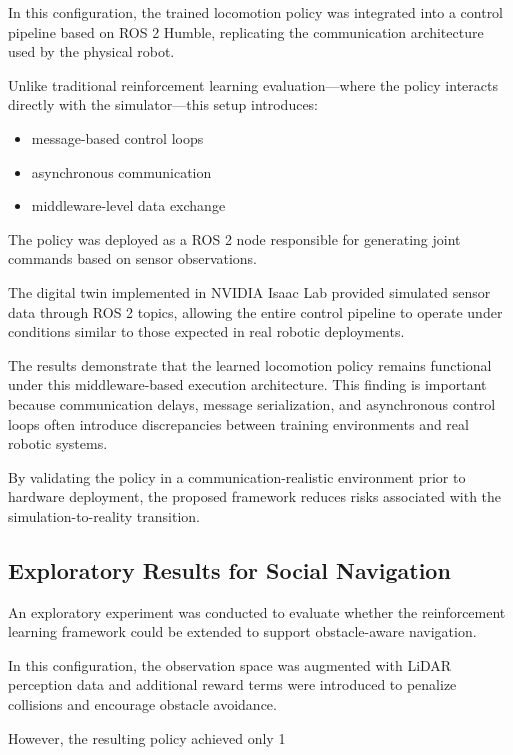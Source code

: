 \documentclass[pdflatex,sn-mathphys-num]{sn-jnl}%
\theoremstyle{thmstyleone}%
\theoremstyle{thmstyletwo}%
\theoremstyle{thmstylethree}%
\begin{document}
In this configuration, the trained locomotion policy was integrated into a control pipeline based on ROS 2 Humble, replicating the communication architecture used by the physical robot.

Unlike traditional reinforcement learning evaluation—where the policy interacts directly with the simulator—this setup introduces:
\begin{itemize}
    \item message-based control loops
    \item asynchronous communication
    \item middleware-level data exchange
\end{itemize} 

The policy was deployed as a ROS 2 node responsible for generating joint commands based on sensor observations.

The digital twin implemented in NVIDIA Isaac Lab provided simulated sensor data through ROS 2 topics, allowing the entire control pipeline to operate under conditions similar to those expected in real robotic deployments.

The results demonstrate that the learned locomotion policy remains functional under this middleware-based execution architecture. This finding is important because communication delays, message serialization, and asynchronous control loops often introduce discrepancies between training environments and real robotic systems.

By validating the policy in a communication-realistic environment prior to hardware deployment, the proposed framework reduces risks associated with the simulation-to-reality transition.

\subsection{Exploratory Results for Social Navigation}
An exploratory experiment was conducted to evaluate whether the reinforcement learning framework could be extended to support obstacle-aware navigation.

In this configuration, the observation space was augmented with LiDAR perception data and additional reward terms were introduced to penalize collisions and encourage obstacle avoidance.

However, the resulting policy achieved only 1%
\end{document}
